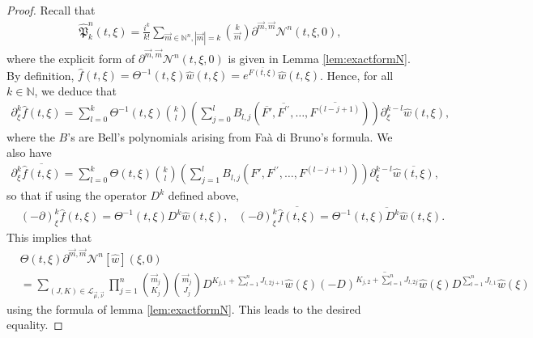 \documentclass[a4paper, 15pt]{article}
\numberwithin{equation}{section}
\begin{document}
\begin{proof}
Recall that 
\begin{align}
    \hat{\mathfrak{P}}^n_k(t,\xi)=\frac{i^k}{k!}\sum_{\overrightarrow{m}\in\mathbb{N}^n,|\overrightarrow{m}|=k}\binom{k}{\overrightarrow{m}}
\partial^{\overrightarrow{m},\overrightarrow{m}}\mathcal{N}^n(t,\xi,0),
\end{align}
where the explicit form of $\partial^{\overrightarrow{m},\overrightarrow{m}}\mathcal{N}^n(t,\xi,0)$ is given in Lemma \ref{lem:exactformN}. By definition, $\hat{f}(t,\xi)=\Theta^{-1}(t,\xi)\hat{w}(t,\xi)=e^{\overline{F(t,\xi)}}\hat{w}(t,\xi)$. Hence, for all $k\in\mathbb{N}$, we deduce that
\begin{align*}
\partial^k_\xi\hat{f}(t,\xi)=\sum_{l=0}^k\Theta^{-1}(t,\xi)\binom{k}{l}(\sum_{j=0}^lB_{l,j}(\overline{F'},\overline{F^{\prime\prime}},\dots,\overline{F^{(l-j+1)}}))\partial_\xi^{k-l}\hat{w}(t,\xi),
\end{align*}
where the $B$'s are Bell's polynomials arising from Faà di Bruno's formula. We also have 
\begin{align*}
\partial^k_\xi\overline{\hat{f}(t,\xi)}=\sum_{l=0}^k\Theta(t,\xi)\binom{k}{l}(\sum_{j=1}^lB_{l,j}(F',F^{\prime\prime},\dots,F^{(l-j+1)}))\partial_\xi^{k-l}\overline{\hat{w}(t,\xi)},
\end{align*}
so that if using the operator $D^k$ defined above, 
\begin{align}
&(-\partial)^k_\xi\hat{f}(t,\xi)=\Theta^{-1}(t,\xi)D^k\hat{w}(t,\xi), &(-\partial)^k_\xi\overline{\hat{f}(t,\xi)}=\overline{\Theta^{-1}(t,\xi)D^k\hat{w}(t,\xi)}.
\end{align}
This implies that 
\begin{align*}
    &\Theta(t,\xi)\partial^{\overrightarrow{m},\overrightarrow{m}}\mathcal{N}^n[\hat{w}](\xi,0)\\
    &=\sum_{(J,K)\in\mathscr{L}_{\overrightarrow{\mu},\overrightarrow{\nu}}}\prod^n_{j=1}\binom{\overrightarrow{m}_j}{K_j}\binom{\overrightarrow{m}_j}{J_j}D^{K_{j,1}+\sum_{l=1}^{n}J_{l,2j+1}}\hat{w}(\xi)\overline{(-D)^{K_{j,2}+\sum_{l=1}^{n}J_{l,2j}}\hat{w}(\xi)}D^{\sum_{l=1}^{n}J_{l,1}}\hat{w}(\xi)
\end{align*}
using the formula of lemma \ref{lem:exactformN}. This leads to the desired equality.
\end{proof}
\end{document}
